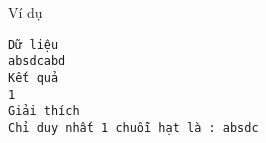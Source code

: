 Ví dụ
\begin{verbatim}
Dữ liệu
absdcabd
Kết quả
1
Giải thích
Chỉ duy nhất 1 chuỗi hạt là : absdc
\end{verbatim}